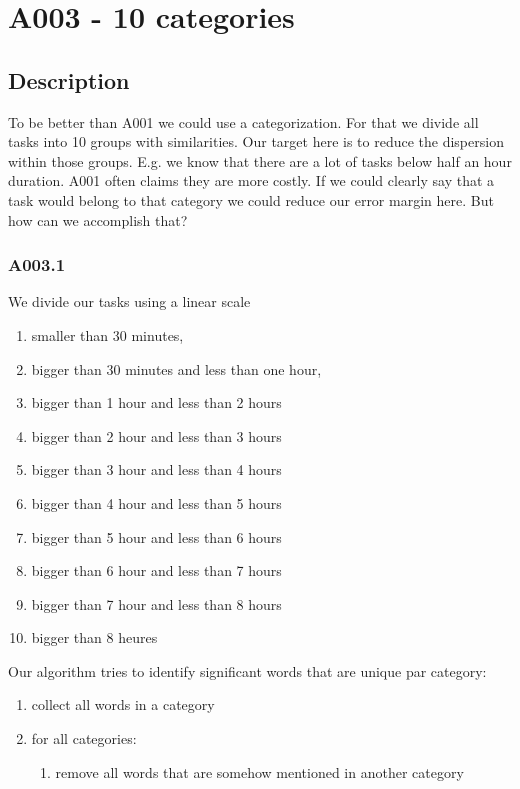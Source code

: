 \newpage{}

\hypertarget{a003---10-categories}{%
\section{A003 - 10 categories}\label{a003---10-categories}}

\hypertarget{description}{%
\subsection{Description}}

To be better than A001 we could use a categorization.
For that we divide all tasks into 10 groups with similarities. 
Our target here is to reduce the dispersion within those groups. E.g. we know that there are a lot of tasks below half an hour duration. A001 often claims they are more costly. If we could clearly say that a task would belong to that category we could reduce our error margin here.
But how can we accomplish that?

\subsubsection{A003.1}

We divide our tasks using a linear scale
\begin{enumerate}
\tightlist
\item smaller than 30 minutes,
\item bigger than 30 minutes and less than one hour,
\item bigger than 1 hour and less than 2 hours
\item bigger than 2 hour and less than 3 hours
\item bigger than 3 hour and less than 4 hours
\item bigger than 4 hour and less than 5 hours
\item bigger than 5 hour and less than 6 hours
\item bigger than 6 hour and less than 7 hours
\item bigger than 7 hour and less than 8 hours
\item bigger than 8 heures
\end{enumerate}

Our algorithm tries to identify significant words that are unique par category:
\begin{enumerate}
\tightlist
\item collect all words in a category
\item for all categories:
    \begin{enumerate}
        \tightlist
        \item remove all words that are somehow mentioned in another category
    \end{enumerate}
\end{enumerate}